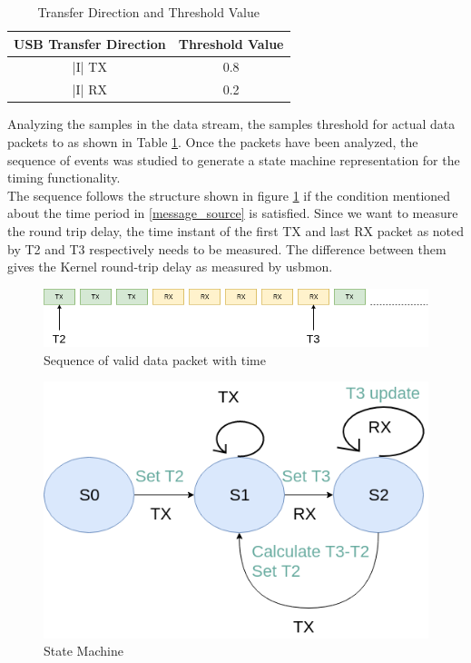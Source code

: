 \documentclass{kththesis}
\begin{document}
\begin{table}
\centering
\begin{tabular}{|c|c|}
\hline
USB Transfer Direction & Threshold Value  \\
\hline
|I| TX & 0.8\\
|I| RX & 0.2\\
\hline
\end{tabular}
\caption{Transfer Direction and Threshold Value}
\label{thres_table}
\end{table}

Analyzing the samples in the data stream, the samples threshold for actual data packets to as shown in Table \ref{thres_table}.  Once the packets have been analyzed, the sequence of events was studied to generate a state machine representation for the timing functionality.\\ 
The sequence follows the structure shown in figure \ref{sequence} if the condition mentioned about the time period in \ref{message_source} is satisfied. Since we want to measure the round trip delay, the time instant of the first TX and last RX packet as noted by T2 and T3 respectively needs to be measured. The difference between them gives the Kernel round-trip delay as measured by usbmon.    
\begin{figure}[h!]
\centering
\includegraphics[width=\textwidth]{Figure/Sequence.png}
\caption{Sequence of valid data packet with time}
\label{sequence}
\end{figure}
\begin{figure}[h!]
\centering
\includegraphics[scale=0.5]{Figure/State_Machine.png}
\caption{State Machine}
\label{state_machine}
\end{figure}
\end{document}
